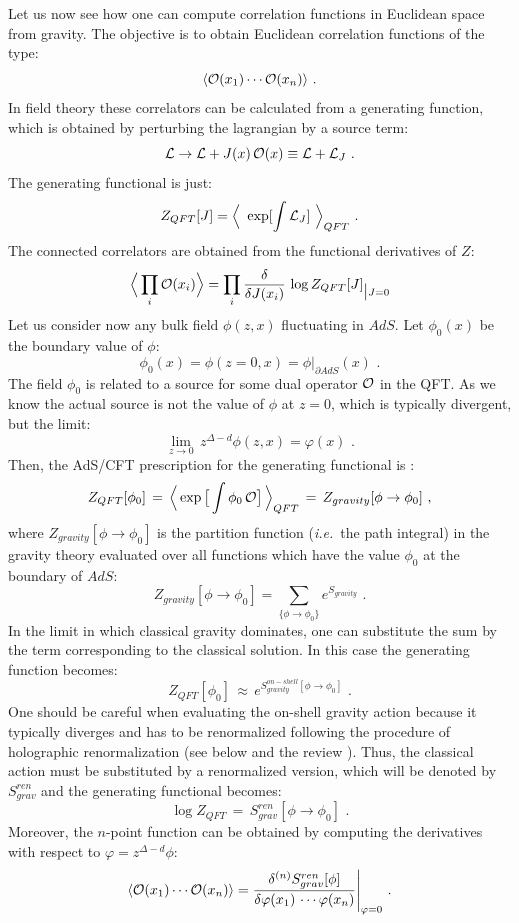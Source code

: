 \documentclass[12pt,notitlepage]{article}
\newcommand{\beq}{\begin{equation}}
\newcommand{\eeq}{\end{equation}}
\def\ie{{\emph{i.e.}}}
\begin{document}
Let us now see how one can compute correlation functions in Euclidean space from gravity. The objective is to obtain Euclidean correlation functions of the type:
 \beq
\langle {\cal O}(x_1)\cdots {\cal O}(x_n)\rangle\,\,.
\eeq
In field theory these correlators can be calculated from a generating function, which is 
obtained by perturbing the lagrangian by a source term:
\beq
{\cal L}\to {\cal L}+J(x)\,{\cal O}(x)\equiv {\cal L}+{\cal L}_J\,\,.
\eeq
The generating functional is just:
\beq
Z_{QFT}[J]=\Big\langle\,\, \exp[\int {\cal L}_J]\,\,\Big\rangle_{QFT}\,\,.
\eeq
The connected correlators are obtained from the functional derivatives of $Z$:
\beq
\Big\langle \prod_{i}{\cal O}(x_i)\Big\rangle=
 \prod_{i} {\delta\over \delta J(x_i)}\,\log Z_{QFT}[J]_{\big|J=0}
 \eeq
Let us consider now  any bulk field $\phi(z,x)$  fluctuating in $AdS$. Let $\phi_0(x)$ be the boundary value of $\phi$:
\beq
\phi_0(x)=\phi(z=0,x)=\phi |_{\partial AdS}(x)\,\,.
\eeq
The field $\phi_0$ is   related to a source for some dual operator ${\cal O}$ in the QFT. As we know the actual source is not the value of $\phi$ at $z=0$, which is typically divergent, but the limit:
\beq
\lim_{z\to 0}\,z^{\Delta-d}\phi(z,x)=\varphi(x)\,\,.
\label{renor-field}
\eeq
Then, the  AdS/CFT prescription for the generating functional is \cite{Gubser:1998bc,Witten:1998qj}:
\beq
Z_{QFT}[\phi_0]\,=\,
\Big\langle \exp\big[\int \phi_0\, {\cal O}\big]\,\Big\rangle_{QFT}\,=\,
Z_{gravity} [\phi\to \phi_0]\,\,,
\eeq
where $Z_{gravity} [\phi\to \phi_0]$ is the partition function (\ie\ the path integral) in the gravity theory evaluated over all functions  which have the value $\phi_0$ at the boundary of $AdS$:
\beq
Z_{gravity} [\phi\to \phi_0]=\sum_{\{\phi\to \phi_0\}} e^{S_{gravity}}\,\,.
\eeq
In the limit in which classical gravity dominates, one can substitute the sum by the term corresponding to the classical solution. In this case the generating function becomes:
\beq
Z_{QFT}[\phi_0]\,\approx\,
e^{S_{gravity}^{on-shell}[\phi\to\phi_0]}\,\,.
\eeq
One should be careful when evaluating the on-shell gravity action because it typically diverges and has to be renormalized following the procedure of holographic renormalization \cite{Henningson:1998gx,deHaro:2000xn} (see below and  the review \cite{Skenderis:2002wp}). Thus, the classical action must be substituted by a renormalized version, which will be denoted by $S_{grav}^{ren}$ and the generating functional becomes:
\beq
\log Z_{QFT}\,=\,S_{grav}^{ren}[\phi\to\phi_0]\,\,.
\eeq
Moreover, the $n$-point function can be obtained by computing the derivatives with respect to $\varphi=z^{\Delta-d}\phi$:
\beq
\langle {\cal O}(x_1)\cdots {\cal O}(x_n)\rangle=
{\delta^{(n)} S_{grav}^{ren}[\phi]\over \delta\varphi(x_1)\,\cdots \varphi(x_n)}\Bigg|_{\varphi=0}\,\,.
\eeq
\end{document}
